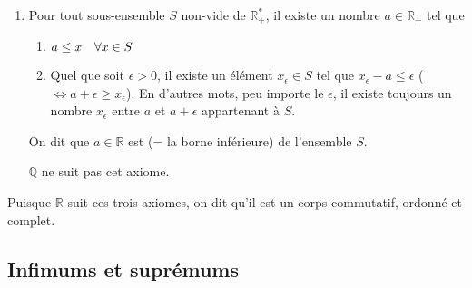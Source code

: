 \documentclass{article}
\begin{document}
{\begin{enumerate}[left=0pt]
               Si $x \leq y$ et $x \neq y$, alors $x < y$. De la même manière, si $x \geq y$ et $x \neq y$, alors $x > y$.

              Cet axiome nous permet d'éliminer $\mathbb{C}$ de la définition. Cependant, $\mathbb{Q}$  est toujours là.

        \item {} Pour tout sous-ensemble $S$ non-vide de $\mathbb{R}^*_+$, il existe un nombre $a \in \mathbb{R}_+$ tel que
              \begin{enumerate}
                  \item $a \leq x \quad \forall x \in S$
                  \item Quel que soit $\epsilon > 0$, il existe un élément $x_{\epsilon} \in S$ tel que $x_{\epsilon} - a \leq \epsilon$ ($\iff a + \epsilon \geq x_{\epsilon}$). En d'autres mots, peu importe le $\epsilon$, il existe toujours un nombre $x_{\epsilon}$ entre $a$ et $a + \epsilon$ appartenant à $S$.
              \end{enumerate}

              On dit que $a \in \mathbb{R}$ est  (= la borne inférieure) de l'ensemble $S$.

              $\mathbb{Q}$ ne suit pas cet axiome.
    \end{enumerate}

    Puisque $\mathbb{R}$ suit ces trois axiomes, on dit qu'il est un corps commutatif, ordonné et complet.
}

\subsection{Infimums et suprémums}
\end{document}
